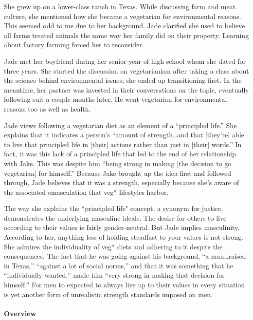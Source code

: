 \documentclass[twoside]{report}
\begin{document}
\begin{multicols}{2}
She grew up on a lower-class ranch in Texas. While discussing farm and meat culture, she mentioned how she became a vegetarian for environmental reasons.
This seemed odd to me due to her background. Jade clarified she used to believe all farms treated animals the same way her family did on their property. Learning about factory farming forced her to reconsider.

Jade met her boyfriend during her senior year of high school whom she dated for three years. She started the discussion on vegetarianism after taking a class about the science behind environmental issues; she ended up transitioning first. In the meantime, her partner was invested in their conversations on the topic, eventually following suit a couple months later. He went vegetarian for environmental reasons too as well as health.

Jade views following a vegetarian diet as an element of a ``principled
life.'' She explains that it indicates a person's
``amount of strength\ldots{}and that {[}they're{]} able to live that
principled life in {[}their{]} actions rather than just in {[}their{]}
words.'' In fact, it was this lack of a principled life that led to the
end of her relationship with Jake. This was despite him ``being strong
in making {[}the decision to go vegetarian{]} for himself.'' Because
Jake brought up the idea first and followed through, Jade believes that
it was a strength, especially because she's aware of the associated
emasculation that veg* lifestyles harbor.

The way she explains the ``principled life" concept, a synonym for
justice, demonstrates the underlying masculine ideals. The desire for
others to live according to their values is fairly gender-neutral. But Jade implies masculinity. According to her, anything less of holding steadfast to your values is not strong. She admires the individuality of veg* diets and adhering to it despite the consequences. The fact that he was going against his background, ``a man\ldots{}raised in Texas,'' ``against a lot of social
norms,'' and that it was something that he ``individually wanted,'' made
him ``very strong in making that decision for himself." For men to expected to always live up to their values in every situation is yet another form of unrealistic strength standards imposed on men.

\paragraph{Overview}


\end{multicols}
\end{document}
